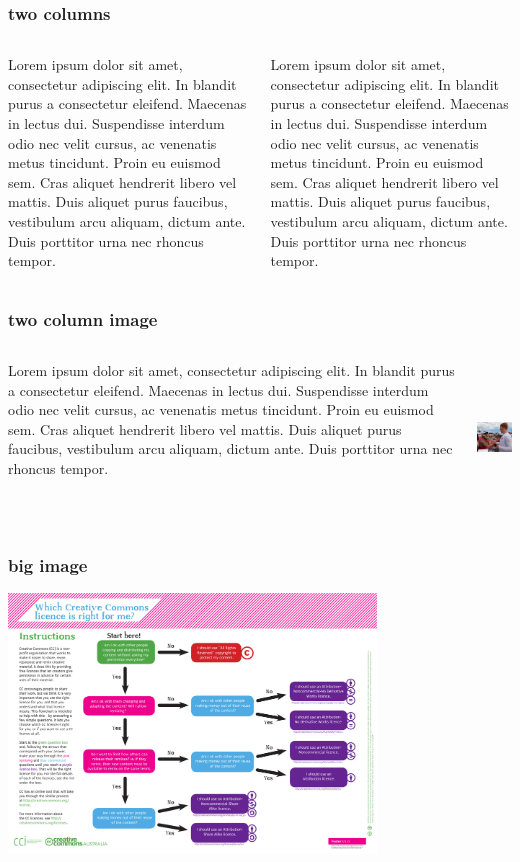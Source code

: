 \documentclass[hyperref={pdfpagelabels=false},spanish]{beamer}
\begin{document}
\begin{frame}
\frametitle{two columns} 
	\begin{columns}[t]
		\begin{column}{5cm}
			Lorem ipsum dolor sit amet, consectetur adipiscing elit. In blandit purus a consectetur eleifend. Maecenas in lectus dui. Suspendisse interdum odio nec velit cursus, ac venenatis metus tincidunt. Proin eu euismod sem. Cras aliquet hendrerit libero vel mattis. Duis aliquet purus faucibus, vestibulum arcu aliquam, dictum ante. Duis porttitor urna nec rhoncus tempor.
		\end{column}
		\begin{column}{5cm}
			Lorem ipsum dolor sit amet, consectetur adipiscing elit. In blandit purus a consectetur eleifend. Maecenas in lectus dui. Suspendisse interdum odio nec velit cursus, ac venenatis metus tincidunt. Proin eu euismod sem. Cras aliquet hendrerit libero vel mattis. Duis aliquet purus faucibus, vestibulum arcu aliquam, dictum ante. Duis porttitor urna nec rhoncus tempor.
		\end{column}
	\end{columns}
\end{frame}

\begin{frame}
\frametitle{two column image} 
	\begin{columns}[c]
		\begin{column}{5cm}
		Lorem ipsum dolor sit amet, consectetur adipiscing elit. In blandit purus a consectetur eleifend. Maecenas in lectus dui. Suspendisse interdum odio nec velit cursus, ac venenatis metus tincidunt. Proin eu euismod sem. Cras aliquet hendrerit libero vel mattis. Duis aliquet purus faucibus, vestibulum arcu aliquam, dictum ante. Duis porttitor urna nec rhoncus tempor.
		\end{column}
		\begin{column}{5cm}
			\includegraphics[height=4cm]{barba-con-cervezas.jpg}
		\end{column}
	\end{columns}
\end{frame}

\begin{frame}
\frametitle{big image}
	\begin{center} 
		\includegraphics[height=6.9cm]{licensing-flowchart.pdf}
	\end{center}
\end{frame}
\end{document}
